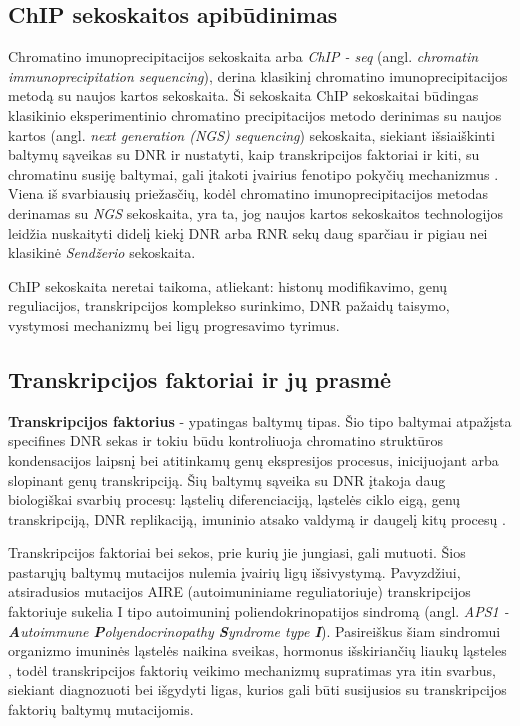 \documentclass[12pt]{article}
\begin{document}
\subsection{ChIP sekoskaitos apibūdinimas}
Chromatino imunoprecipitacijos sekoskaita arba \emph{ChIP - seq}
(angl. \emph{chromatin immunoprecipitation sequencing}), derina klasikinį
chromatino imunoprecipitacijos metodą su naujos kartos sekoskaita. Ši sekoskaita
ChIP sekoskaitai būdingas klasikinio eksperimentinio chromatino precipitacijos
metodo derinimas
su naujos kartos (angl. \emph{next generation (NGS) sequencing}) sekoskaita,
siekiant išsiaiškinti baltymų sąveikas su DNR ir nustatyti, kaip transkripcijos
faktoriai ir kiti, su chromatinu susiję baltymai, gali įtakoti įvairius fenotipo
pokyčių mechanizmus \cite{ARTICLE2}. Viena iš svarbiausių priežasčių, kodėl
chromatino imunoprecipitacijos metodas derinamas su \emph{NGS} sekoskaita, yra
ta, jog naujos kartos sekoskaitos technologijos leidžia nuskaityti didelį kiekį
DNR arba RNR sekų daug sparčiau ir pigiau nei klasikinė \emph{Sendžerio} 
sekoskaita.

ChIP sekoskaita neretai taikoma, atliekant: histonų modifikavimo, genų
reguliacijos, transkripcijos komplekso surinkimo, DNR pažaidų taisymo,
vystymosi mechanizmų bei ligų progresavimo tyrimus.

\subsection{Transkripcijos faktoriai ir jų prasmė}
\textbf{Transkripcijos faktorius} - ypatingas baltymų tipas. Šio tipo baltymai
atpažįsta specifines DNR sekas ir tokiu būdu kontroliuoja chromatino struktūros
kondensacijos laipsnį bei atitinkamų genų ekspresijos procesus, inicijuojant
arba slopinant genų transkripciją. Šių baltymų sąveika su DNR įtakoja daug
biologiškai svarbių procesų: ląstelių diferenciaciją, ląstelės ciklo eigą, genų
transkripciją, DNR replikaciją, imuninio atsako valdymą ir daugelį kitų
procesų \cite{ARTICLE10, ARTICLE11}.

Transkripcijos faktoriai bei sekos, prie kurių jie jungiasi, gali
mutuoti. Šios pastarųjų baltymų mutacijos nulemia įvairių ligų išsivystymą.
Pavyzdžiui, atsiradusios mutacijos AIRE (autoimuniniame reguliatoriuje)
transkripcijos faktoriuje sukelia I tipo autoimuninį poliendokrinopatijos
sindromą \cite{ARTICLE9} (angl. \emph{APS1 - \textbf{A}utoimmune
\textbf{P}olyendocrinopathy \textbf{S}yndrome type \textbf{I}}). Pasireiškus
šiam sindromui organizmo imuninės ląstelės naikina sveikas, hormonus
išskiriančių liaukų ląsteles \cite{ASP1}, todėl transkripcijos faktorių veikimo
mechanizmų supratimas yra itin svarbus, siekiant diagnozuoti bei išgydyti ligas,
kurios gali būti susijusios su transkripcijos faktorių baltymų mutacijomis.
\end{document}
